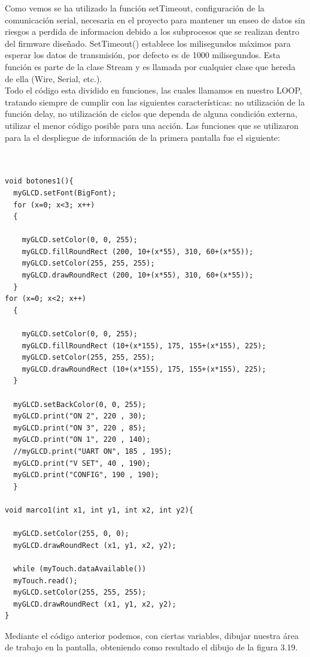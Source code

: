 Como vemos se ha utilizado la función setTimeout, configuración de la comunicación serial, necesaria en el proyecto para mantener un enseo de datos sin riesgos a perdida de informacion debido a los subprocesos que se realizan dentro del firmware diseñado. SetTimeout() establece los milisegundos máximos para esperar los datos de transmisión, por defecto es de 1000 milisegundos. Esta función es parte de la clase Stream y es llamada por cualquier clase que hereda de ella (Wire, Serial, etc.). \cite{settime}\\


Todo el código esta dividido en funciones, las cuales llamamos en nuestro LOOP, tratando siempre de cumplir con las siguientes características: no utilización de la función delay, no utilización de ciclos que dependa de alguna condición externa, utilizar el menor código posible para una acción. Las funciones que se utilizaron para la el despliegue de información de la primera pantalla fue el siguiente:


\begin{verbatim}

 
void botones1(){ 
  myGLCD.setFont(BigFont); 
  for (x=0; x<3; x++)
  {
  
    myGLCD.setColor(0, 0, 255);
    myGLCD.fillRoundRect (200, 10+(x*55), 310, 60+(x*55));
    myGLCD.setColor(255, 255, 255);
    myGLCD.drawRoundRect (200, 10+(x*55), 310, 60+(x*55));
  }
for (x=0; x<2; x++)
  {
  
    myGLCD.setColor(0, 0, 255);
    myGLCD.fillRoundRect (10+(x*155), 175, 155+(x*155), 225);
    myGLCD.setColor(255, 255, 255);
    myGLCD.drawRoundRect (10+(x*155), 175, 155+(x*155), 225);
  }
  
  myGLCD.setBackColor(0, 0, 255);
  myGLCD.print("ON 2", 220 , 30);
  myGLCD.print("ON 3", 220 , 85);
  myGLCD.print("ON 1", 220 , 140);
  //myGLCD.print("UART ON", 185 , 195);
  myGLCD.print("V SET", 40 , 190);
  myGLCD.print("CONFIG", 190 , 190);
  }
  
void marco1(int x1, int y1, int x2, int y2){ 

  myGLCD.setColor(255, 0, 0);
  myGLCD.drawRoundRect (x1, y1, x2, y2);
  
  while (myTouch.dataAvailable())
  myTouch.read();
  myGLCD.setColor(255, 255, 255);
  myGLCD.drawRoundRect (x1, y1, x2, y2);
}
\end{verbatim}

Mediante el código anterior podemos, con ciertas variables, dibujar nuestra área de trabajo en la pantalla, obteniendo como resultado el dibujo de la figura 3.19.

